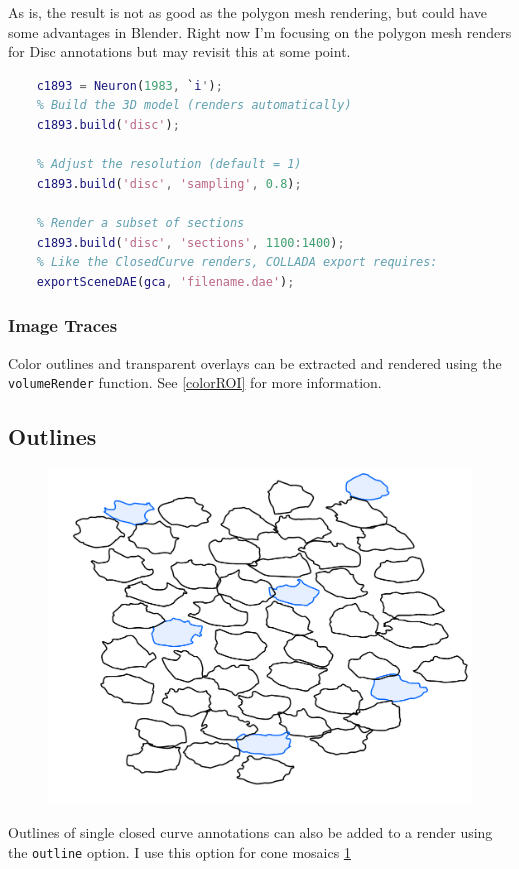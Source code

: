 \documentclass[12pt]{exam}
\begin{document}
	As is, the result is not as good as the polygon mesh rendering, but could have some advantages in Blender. Right now I'm focusing on the polygon mesh renders for Disc annotations but may revisit this at some point.
	\begin{lstlisting}[language=matlab]
	% Load a rod bipolar cell
	c1893 = Neuron(1983, `i');
	% Build the 3D model (renders automatically)
	c1893.build('disc');
	
	% Adjust the resolution (default = 1)
	c1893.build('disc', 'sampling', 0.8);
	
	% Render a subset of sections
	c1893.build('disc', 'sections', 1100:1400);
	% Like the ClosedCurve renders, COLLADA export requires:
	exportSceneDAE(gca, 'filename.dae');\end{lstlisting}

	\subsubsection{Image Traces}
	Color outlines and transparent overlays can be extracted and rendered using the \texttt{volumeRender} function. See \ref{colorROI} for more information.
	\subsection{Outlines}
	\begin{figure}
		\includegraphics[width=\linewidth]{cone_mosaic}
		\label{mosaicfig}
	\end{figure}
	Outlines of single closed curve annotations can also be added to a render using the \texttt{outline} option. I use this option for cone mosaics \ref{mosaicfig}
	
\end{document}
